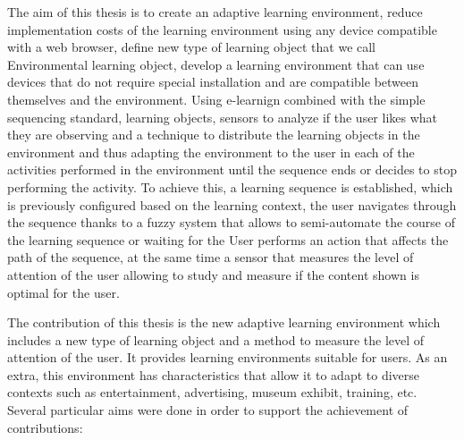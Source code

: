 The aim of this thesis is to create an adaptive learning environment, reduce implementation costs of the learning environment using any device compatible with a web browser,
define new type of learning object that we call Environmental learning object, develop a learning environment that can use devices that do not require special installation and are compatible between themselves and the environment. Using e-learnign combined with the simple sequencing standard, learning objects, sensors to analyze if the user likes what they are observing and a technique to distribute the learning objects in the environment and thus adapting the environment to the user in each of the activities performed in the environment until the sequence ends or decides to stop performing the activity. To achieve this, a learning sequence is established, which is previously configured based on the learning context, the user navigates through the sequence thanks to a fuzzy system that allows to semi-automate the course of the learning sequence or waiting for the User performs an action that affects the path of the sequence, at the same time a sensor that measures the level of attention of the user allowing to study and measure if the content shown is optimal for the user.

The contribution of this thesis is the new adaptive learning environment which includes a new type of learning object and a method to measure the level of attention of the user. It provides learning environments suitable for users. As an extra, this environment has characteristics that allow it to adapt to diverse contexts such as entertainment, advertising, museum exhibit, training, etc.
Several particular aims were done in order to support the achievement of contributions:

